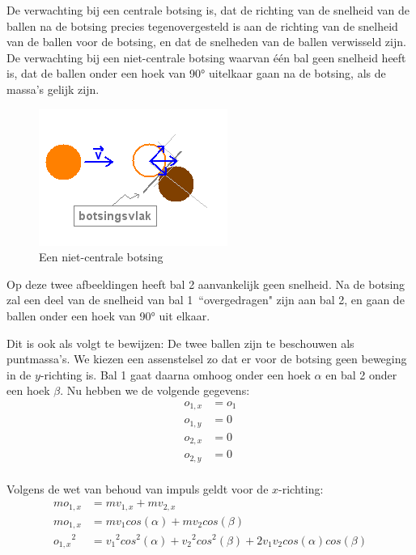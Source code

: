 \documentclass[12pt,a4paper]{article}
\begin{document}
	De verwachting bij een centrale botsing is, dat de richting van de snelheid van de ballen na de botsing precies tegenovergesteld is aan de richting van de snelheid van de ballen voor de botsing, en dat de snelheden van de ballen verwisseld zijn.
	De verwachting bij een niet-centrale botsing waarvan \'{e}\'{e}n bal geen snelheid heeft is, dat de ballen onder een hoek van 90° uitelkaar gaan na de botsing, als de massa's gelijk zijn. 
	
	\begin{figure}[h]
		\centerline{\includegraphics{Plaatjes/BotsingSchuin.png}}
		\caption{Een niet-centrale botsing}
		\label{botsingschuin}
	\end{figure}
	
	Op deze twee afbeeldingen heeft bal 2 aanvankelijk geen snelheid. Na de botsing zal een deel van de snelheid van bal 1\ ``overgedragen" zijn aan bal 2, en gaan de ballen onder een hoek van 90° uit elkaar.

	Dit is ook als volgt te bewijzen:
	De twee ballen zijn te beschouwen als puntmassa's. We kiezen een assenstelsel zo dat er voor de botsing geen beweging in de $y$-richting is. Bal 1 gaat daarna omhoog onder een hoek $\alpha$ en bal 2 onder een hoek $\beta$. Nu hebben we de volgende gegevens:
	\begin{equation}
	\begin{aligned}
		o_{1, x}&=o_1\\
		o_{1, y}&=0\\
		o_{2, x}&=0\\
		o_{2, y}&=0\\
	\end{aligned}
	\end{equation}

	Volgens de wet van behoud van impuls geldt voor de $x$-richting:
	\begin{equation}
	\begin{aligned}
	\label{voorbeeld 1.1}
		mo_{1, x}&=mv_{1, x}+mv_{2, x}\\
		mo_{1, x}&=mv_1cos(\alpha)+mv_2cos(\beta)\\
		{o_{1, x}}^2&={v_1}^2cos^2(\alpha)+{v_2}^2cos^2(\beta)+2v_1v_2cos(\alpha)cos(\beta)\\
	\end{aligned}
	\end{equation}
\end{document}
